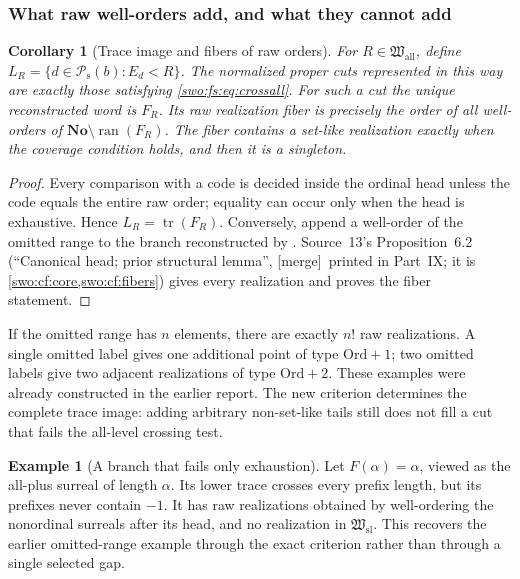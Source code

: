 \documentclass[11pt]{article}
\newtheorem{corollary}[corollary]{Corollary}
\theoremstyle{definition}
\newtheorem{example}[example]{Example}
\theoremstyle{remark}
\newcommand{\No}{\mathbf{No}}
\newcommand{\Ord}{\mathrm{Ord}}
\newcommand{\Hsl}{\mathfrak W_{\mathrm{sl}}}
\newcommand{\Hall}{\mathfrak W_{\mathrm{all}}}
\newcommand{\Psupp}{\mathcal P_{\mathrm{s}}}
\newcommand{\ran}{\operatorname{ran}}
\newcommand{\merge}{\textsf{[merge]}}
\begin{document}
\subsubsection{What raw well-orders add, and what they cannot add}

\begin{corollary}[Trace image and fibers of raw orders]\label{swo:fs:cor:rawtraces}
For $R\in\Hall$, define $L_R=\{d\in \Psupp(b):E_d<R\}$. The normalized
proper cuts represented in this way are exactly those satisfying
\eqref{swo:fs:eq:crossall}. For such a cut the unique reconstructed word
is $F_R$. Its raw realization fiber is precisely the order of all
well-orders of $\No\setminus\ran(F_R)$. The fiber contains a set-like
realization exactly when the coverage condition holds, and then it is
a singleton.
\end{corollary}
\begin{proof}
Every comparison with a code is decided inside the ordinal head unless
the code equals the entire raw order; equality can occur only when the
head is exhaustive. Hence $L_R=\operatorname{tr}(F_R)$. Conversely, append a
well-order of the omitted range to the branch reconstructed by
. Source~13's Proposition~6.2 (``Canonical
head; prior structural lemma'', \merge\ printed in Part~IX; it is
\cref{swo:cf:core,swo:cf:fibers})
gives every realization and proves the fiber statement.
\end{proof}

If the omitted range has $n$ elements, there are exactly $n!$ raw
realizations. A single omitted label gives one additional point of type
$\Ord+1$; two omitted labels give two adjacent realizations of type
$\Ord+2$. These examples were already constructed in the earlier
report. The new criterion determines the complete trace image: adding
arbitrary non-set-like tails still does not fill a cut that fails the
all-level crossing test.

\begin{example}[A branch that fails only exhaustion]\label{swo:fs:n8.5}
Let $F(\alpha)=\alpha$, viewed as the all-plus surreal of length
$\alpha$. Its lower trace crosses every prefix length, but its prefixes
never contain $-1$. It has raw realizations obtained by well-ordering
the nonordinal surreals after its head, and no realization in $\Hsl$.
This recovers the earlier omitted-range example through the exact
criterion rather than through a single selected gap.
\end{example}
\end{document}
